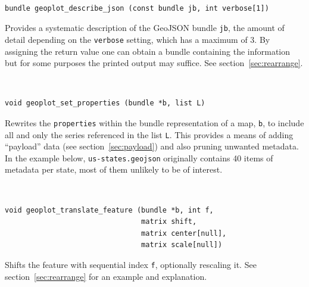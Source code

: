 \documentclass{article}
\newenvironment{funcdoc}
{\noindent\hrulefill\\[-10pt]}
{\medskip}
\begin{document}
\begin{funcdoc}
\begin{verbatim}
bundle geoplot_describe_json (const bundle jb, int verbose[1])
\end{verbatim}
  Provides a systematic description of the GeoJSON bundle \texttt{jb},
  the amount of detail depending on the \texttt{verbose} setting,
  which has a maximum of 3. By assigning the return value one can
  obtain a bundle containing the information but for some purposes the
  printed output may suffice. See section~\ref{sec:rearrange}.
\end{funcdoc}

\begin{funcdoc}
\begin{verbatim}
void geoplot_set_properties (bundle *b, list L)
\end{verbatim}
  Rewrites the \texttt{properties} within the bundle representation of
  a map, \texttt{b}, to include all and only the series referenced in
  the list \texttt{L}. This provides a means of adding ``payload''
  data (see section~\ref{sec:payload}) and also pruning unwanted
  metadata.  In the example below, \texttt{us-states.geojson}
  originally contains 40 items of metadata per state, most of them
  unlikely to be of interest.
\end{funcdoc}

\begin{funcdoc}
\begin{verbatim}
void geoplot_translate_feature (bundle *b, int f,
                                matrix shift,
                                matrix center[null],
                                matrix scale[null])
\end{verbatim}
  Shifts the feature with sequential index \texttt{f}, optionally
  rescaling it. See section~\ref{sec:rearrange} for an example and
  explanation.
\end{funcdoc}
\end{document}
